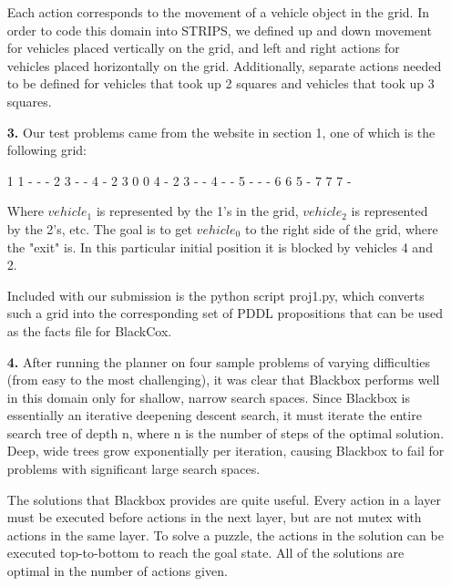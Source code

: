 \documentclass{article}
\begin{document}
\begin{enumerate}
Each action corresponds to the movement of a vehicle object in the grid.
In order to code this domain into STRIPS, we defined up and down
movement for vehicles placed vertically on the grid, and left and right
actions for vehicles placed horizontally on the grid. Additionally,
separate actions needed to be defined for vehicles that took up 2
squares and vehicles that took up 3 squares.

\item[\textbf{3.}]
Our test problems came from the website in section 1, one of which is the following grid:

1 1 - - - 2
3 - - 4 - 2
3 0 0 4 - 2
3 - - 4 - -
5 - - - 6 6
5 - 7 7 7 -

Where $vehicle_1$ is represented by the 1’s in the grid, $vehicle_2$ is
represented by the 2’s, etc. The goal is to get $vehicle_0$ to the right
side of the grid, where the "exit" is. In this particular initial
position it is blocked by vehicles 4 and 2.

Included with our submission is the python script proj1.py, which
converts such a grid into the corresponding set of PDDL propositions
that can be used as the facts file for BlackCox.

\item[\textbf{4.}]
After running the planner on four sample problems of varying
difficulties (from easy to the most challenging), it was clear that
Blackbox performs well in this domain only for shallow, narrow search
spaces. Since Blackbox is essentially an iterative deepening descent
search, it must iterate the entire search tree of depth n, where n is
the number of steps of the optimal solution.  Deep, wide trees grow
exponentially per iteration, causing Blackbox to fail for problems with
significant large search spaces.

The solutions that Blackbox provides are quite useful. Every action in a
layer must be executed before actions in the next layer, but are not
mutex with actions in the same layer. To solve a puzzle, the actions in
the solution can be executed top-to-bottom to reach the goal state. 
All of the solutions are optimal in the number of actions given.

\end{enumerate}
\end{document}

